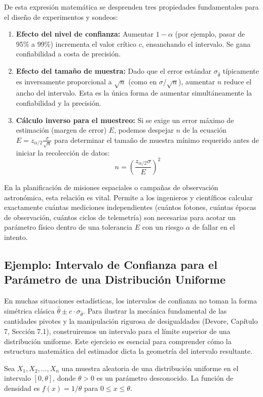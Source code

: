 De esta expresión matemática se desprenden tres propiedades fundamentales para el diseño de experimentos y sondeos:
\begin{enumerate}
    \item \textbf{Efecto del nivel de confianza:} Aumentar $1-\alpha$ (por ejemplo, pasar de 95\% a 99\%) incrementa el valor crítico $c$, ensanchando el intervalo. Se gana confiabilidad a costa de precisión.
    \item \textbf{Efecto del tamaño de muestra:} Dado que el error estándar $\sigma_{\hat{\theta}}$ típicamente es inversamente proporcional a $\sqrt{n}$ (como en $\sigma/\sqrt{n}$), aumentar $n$ reduce el ancho del intervalo. Esta es la única forma de aumentar simultáneamente la confiabilidad y la precisión.
    \item \textbf{Cálculo inverso para el muestreo:} Si se exige un error máximo de estimación (margen de error) $E$, podemos despejar $n$ de la ecuación $E = z_{\alpha/2} \frac{\sigma}{\sqrt{n}}$ para determinar el tamaño de muestra mínimo requerido antes de iniciar la recolección de datos:
    $$ n = \left( \frac{z_{\alpha/2} \sigma}{E} \right)^2 $$
\end{enumerate}

En la planificación de misiones espaciales o campañas de observación astronómica, esta relación es vital. Permite a los ingenieros y científicos calcular exactamente cuántas mediciones independientes (cuántos fotones, cuántas épocas de observación, cuántos ciclos de telemetría) son necesarias para acotar un parámetro físico dentro de una tolerancia $E$ con un riesgo $\alpha$ de fallar en el intento.

\subsection{Ejemplo: Intervalo de Confianza para el Parámetro de una Distribución Uniforme}

En muchas situaciones estadísticas, los intervalos de confianza no toman la forma simétrica clásica $\hat{\theta} \pm c \cdot \sigma_{\hat{\theta}}$. Para ilustrar la mecánica fundamental de las cantidades pivotes y la manipulación rigurosa de desigualdades (Devore, Capítulo 7, Sección 7.1), construiremos un intervalo para el límite superior de una distribución uniforme. Este ejercicio es esencial para comprender cómo la estructura matemática del estimador dicta la geometría del intervalo resultante.

Sea $X_1, X_2, \dots, X_n$ una muestra aleatoria de una distribución uniforme en el intervalo $[0, \theta]$, donde $\theta > 0$ es un parámetro desconocido. La función de densidad es $f(x) = 1/\theta$ para $0 \le x \le \theta$.


